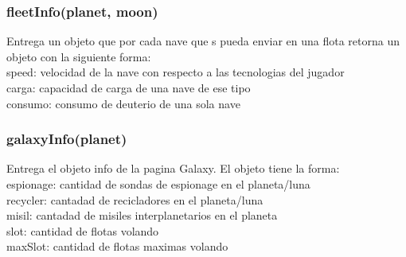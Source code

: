 \documentclass{article}
\newcommand\tab[1][1cm]{\hspace*{#1}}
\begin{document}
        \subsubsection{fleetInfo(planet, moon)}
            Entrega un objeto que por cada nave que s pueda enviar en una flota retorna un objeto con la siguiente forma:\\
            \tab speed: velocidad de la nave con respecto a las tecnologias del jugador\\
            \tab carga: capacidad de carga de una nave de ese tipo\\
            \tab consumo: consumo de deuterio de una sola nave\\
        \subsubsection{galaxyInfo(planet)}
            Entrega el objeto info de la pagina Galaxy. El objeto tiene la forma:\\
            \tab espionage: cantidad de sondas de espionage en el planeta/luna\\
            \tab recycler: cantadad de recicladores en el planeta/luna\\
            \tab misil: cantadad de misiles interplanetarios en el planeta\\
            \tab slot: cantidad de flotas volando\\
            \tab maxSlot: cantidad de flotas maximas volando\\
\end{document}
